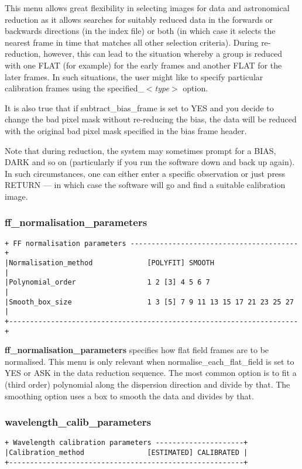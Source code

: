 {This menu allows great flexibility in selecting images for data and
astronomical reduction as it allows searches for suitably reduced
data in the forwards or backwards directions (in the index file) or
both (in which case it selects the nearest frame in time that matches
all other selection criteria). During re-reduction, however, this can lead 
to the situation whereby a group is reduced with one {\sf FLAT} (for example)
for the early frames and another {\sf FLAT} for the later frames. In such
situations, the user might like to specify particular calibration frames using
the {\sf specified\_$<${\em type}$>$} option.

It is also true that if {\sf subtract\_bias\_frame} is set to {\sf YES} and
you decide to change the bad pixel mask without re-reducing the bias, the data
will be reduced with the original bad pixel mask specified in the bias frame 
header. 

Note that during reduction, the system may sometimes prompt for a {\sf BIAS}, 
{\sf DARK} and so on (particularly if you run the software down and back up 
again). In such circumstances, one can either enter a specific observation or 
just press {\sf RETURN} --- in which case the software will go and find a 
suitable calibration image. 

\subsubsection{ff\_normalisation\_parameters} 
\label{ff_normalisation_parameters}
\begin{verbatim}
+ FF normalisation parameters ----------------------------------------+
|Normalisation_method             [POLYFIT] SMOOTH                    |
|Polynomial_order                 1 2 [3] 4 5 6 7                     |
|Smooth_box_size                  1 3 [5] 7 9 11 13 15 17 21 23 25 27 |
+---------------------------------------------------------------------+
\end{verbatim}

{\bf ff\_normalisation\_parameters} specifies how flat field
frames are to be normalised.
This menu is only relevant when {\sf normalise\_each\_flat\_field} is set 
to {\sf YES} or {\sf ASK} in the data reduction sequence.
The most common option is to fit a (third order) polynomial along the 
dispersion direction and divide by that. The smoothing option uses a box 
to smooth the data and divides by that.

\subsubsection{wavelength\_calib\_parameters} 
\label{wavelength_calib_parameters} 
\begin{verbatim}
+ Wavelength calibration parameters ---------------------+
|Calibration_method               [ESTIMATED] CALIBRATED |
+--------------------------------------------------------+
\end{verbatim}

}
